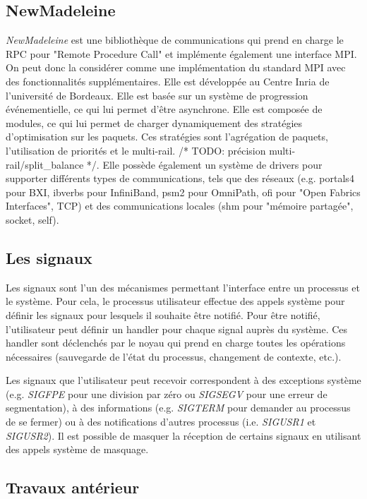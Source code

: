 \subsection{NewMadeleine}

\emph{NewMadeleine} est une bibliothèque de communications qui prend en charge le RPC pour "Remote Procedure Call" et implémente également une interface MPI.
On peut donc la considérer comme une implémentation du standard MPI avec des fonctionnalités supplémentaires.
Elle est développée au Centre Inria de l'université de Bordeaux.
Elle est basée sur un système de progression événementielle, ce qui lui permet d'être asynchrone.
Elle est composée de modules, ce qui lui permet de charger dynamiquement des stratégies d'optimisation sur les paquets.
Ces stratégies sont l'agrégation de paquets, l'utilisation de priorités et le multi-rail. /* TODO: précision multi-rail/split_balance */.
Elle possède également un système de drivers pour supporter différents types de communications, tels que des réseaux
(e.g. portals4 pour BXI, ibverbs pour InfiniBand, psm2 pour OmniPath, ofi pour "Open Fabrics Interfaces", TCP) %
et des communications locales (shm pour "mémoire partagée", socket, self).

\subsection{Les signaux}
\label{sec:signal}

Les signaux\cite{linuxSignalMan} sont l'un des mécanismes permettant l'interface entre un processus et le système.
Pour cela, le processus utilisateur effectue des appels système pour définir les signaux pour lesquels il souhaite être notifié.
Pour être notifié, l'utilisateur peut définir un handler pour chaque signal auprès du système.
Ces handler sont déclenchés par le noyau qui prend en charge toutes les opérations nécessaires (sauvegarde de l'état du processus, changement de contexte, etc.).

Les signaux que l'utilisateur peut recevoir correspondent à des exceptions système (e.g. \emph{SIGFPE} pour une division par zéro ou \emph{SIGSEGV} pour une erreur de segmentation),
à des informations (e.g. \emph{SIGTERM} pour demander au processus de se fermer) ou à des notifications d'autres processus (i.e. \emph{SIGUSR1} et \emph{SIGUSR2}).
Il est possible de masquer la réception de certains signaux en utilisant des appels système de masquage.

\subsection{Travaux antérieur}

